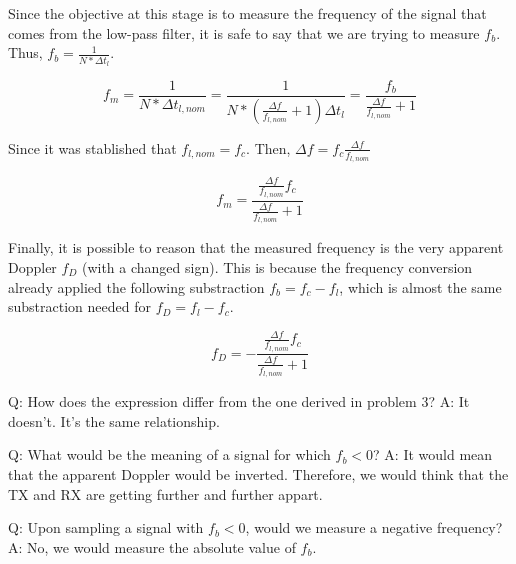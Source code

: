 Since the objective at this stage is to measure the frequency of the signal that
comes from the low-pass filter, it is safe to say that we are trying to measure
$f_b$. Thus, $f_b = \frac{1}{N*\Delta t_l}$.

\begin{equation}
	f_m = \frac{1}{N * \Delta t_{l,nom}}
	= \frac{1}{N *(\frac{\Delta f}{f_{l,nom}} + 1) \Delta t_l}
	= \frac{f_b}{\frac{\Delta f}{f_{l,nom}} + 1}
\end{equation}

Since it was stablished that $f_{l,nom} = f_c$.
Then, $\Delta f = f_c \frac{\Delta f}{f_{l,nom}}$

\begin{equation}
	f_m = \frac{\frac{\Delta f}{f_{l,nom}} f_c}{\frac{\Delta f}{f_{l,nom}} + 1}
\end{equation}

Finally, it is possible to reason that the measured frequency is the very
apparent Doppler $f_D$ (with a changed sign). This is because the frequency
conversion already applied the following substraction $f_b = f_c - f_l$, which
is almost the same substraction needed for $f_D = f_l - f_c$.

\begin{equation}
	f_D = -\frac{\frac{\Delta f}{f_{l,nom}} f_c}{\frac{\Delta f}{f_{l,nom}} + 1}
\end{equation}

Q: How does the expression differ from the one derived in problem 3?
A: It doesn't. It's the same relationship.

Q: What would be the meaning of a signal for which $f_b < 0$?
A: It would mean that the apparent Doppler would be inverted. Therefore, we
would think that the TX and RX are getting further and further appart.

Q: Upon sampling a signal with $f_b < 0$, would we measure a negative frequency?
A: No, we would measure the absolute value of $f_b$.

